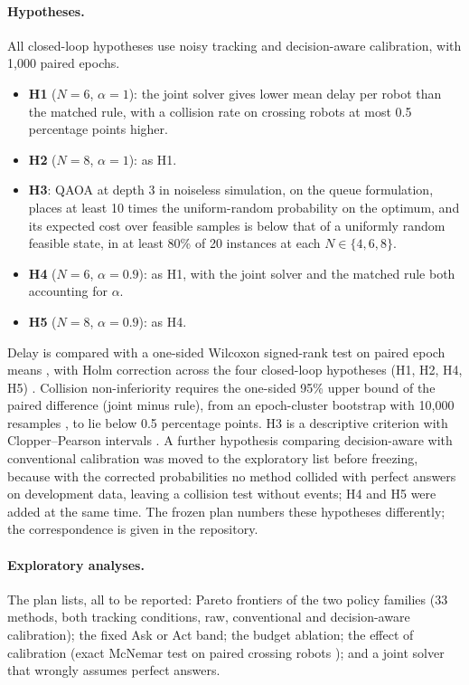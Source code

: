 \documentclass[a4paper,fleqn]{cas-dc}
\begin{document}
\paragraph{Hypotheses.} All closed-loop hypotheses use noisy tracking and decision-aware calibration, with 1{,}000 paired epochs.
\begin{itemize}
\item \textbf{H1} ($N = 6$, $\alpha = 1$): the joint solver gives lower mean delay per robot than the matched rule, with a collision rate on crossing robots at most 0.5 percentage points higher.
\item \textbf{H2} ($N = 8$, $\alpha = 1$): as H1.
\item \textbf{H3}: QAOA at depth 3 in noiseless simulation, on the queue formulation, places at least 10 times the uniform-random probability on the optimum, and its expected cost over feasible samples is below that of a uniformly random feasible state, in at least 80\% of 20 instances at each $N \in \{4,6,8\}$.
\item \textbf{H4} ($N = 6$, $\alpha = 0.9$): as H1, with the joint solver and the matched rule both accounting for $\alpha$.
\item \textbf{H5} ($N = 8$, $\alpha = 0.9$): as H4.
\end{itemize}
Delay is compared with a one-sided Wilcoxon signed-rank test on paired epoch means \citep{wilcoxon1945}, with Holm correction across the four closed-loop hypotheses (H1, H2, H4, H5) \citep{holm1979}. Collision non-inferiority requires the one-sided 95\% upper bound of the paired difference (joint minus rule), from an epoch-cluster bootstrap with 10{,}000 resamples \citep{efron1993bootstrap}, to lie below 0.5 percentage points. H3 is a descriptive criterion with Clopper--Pearson intervals \citep{clopper1934}. A further hypothesis comparing decision-aware with conventional calibration was moved to the exploratory list before freezing, because with the corrected probabilities no method collided with perfect answers on development data, leaving a collision test without events; H4 and H5 were added at the same time. The frozen plan numbers these hypotheses differently; the correspondence is given in the repository.

\paragraph{Exploratory analyses.} The plan lists, all to be reported: Pareto frontiers of the two policy families (33 methods, both tracking conditions, raw, conventional and decision-aware calibration); the fixed Ask or Act band; the budget ablation; the effect of calibration (exact McNemar test on paired crossing robots \citep{mcnemar1947}); and a joint solver that wrongly assumes perfect answers.
\end{document}
